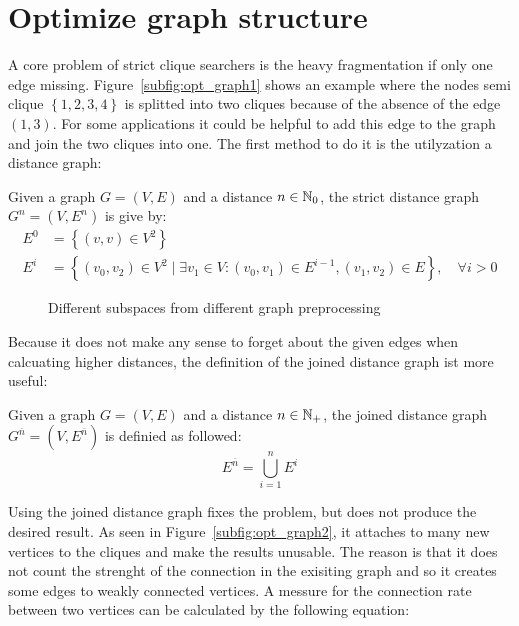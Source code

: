 \section{Optimize graph structure}
A core problem of strict clique searchers is the heavy fragmentation if only one edge missing. Figure~\ref{subfig:opt_graph1} shows an example where the nodes semi clique $\left\{1,2,3,4\right\}$ is splitted into two cliques because of the absence of the edge $(1,3)$. For some applications it could be helpful to add this edge to the graph and join the two cliques into one. The first method to do it is the utilyzation a distance graph:
\begin{envdef}
	Given a graph $G=(V,E)$ and a distance $n \in \mathbb{N}_0$, the strict distance graph $G^n=(V,E^n)$ is give by:
	\begin{align}
		E^0 &= \left\{ (v,v) \in V^2 \right\}\\
		E^i &= \left\{ (v_0,v_2) \in V^2 \mid \exists v_1 \in V : (v_0,v_1) \in E^{i-1}, (v_1,v_2) \in E \right\}, \quad \forall i>0
	\end{align}
\end{envdef}
\begin{figure}
	\caption{Different subspaces from different graph preprocessing}
	\label{fig:opt_graph}
	\centering
	\hfill
	\hfill
	\subfloat[\label{subfig:opt_graph3}Filtered distance with $\alpha=\frac23$]{}
	\hfill
	\subfloat[\label{subfig:opt_graph4}Bidirectional filtered distance with $\alpha=\frac23$]{}
\end{figure}
Because it does not make any sense to forget about the given edges when calcuating higher distances, the definition of the joined distance graph ist more useful:
\begin{envdef}
	Given a graph $G=(V,E)$ and a distance $n \in \mathbb{N}_+$, the joined distance graph $G^{\overline{n}}=(V,E^{\overline{n}})$ is definied as followed:
	\begin{equation}
		E^{\overline{n}} = \bigcup_{i=1}^n E^i
	\end{equation}
\end{envdef}
Using the joined distance graph fixes the problem, but does not produce the desired result. As seen in Figure~\ref{subfig:opt_graph2}, it attaches to many new vertices to the cliques and make the results unusable. The reason is that it does not count the strenght of the connection in the exisiting graph and so it creates some edges to weakly connected vertices. A messure for the connection rate between two vertices can be calculated by the following equation:
